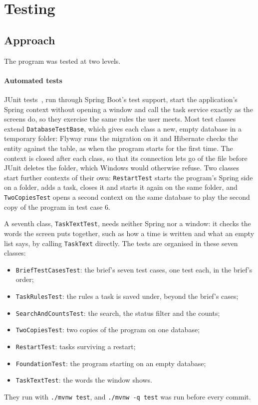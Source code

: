 \section{Testing}\label{sec:testing}

\subsection{Approach}

The program was tested at two levels.

\paragraph*{Automated tests} JUnit tests~\cite{junit}, run through Spring Boot's test support, start the
application's Spring context without opening a window and call the task service exactly as the screens do, so they
exercise the same rules the user meets. Most test classes extend \texttt{DatabaseTestBase}, which gives each class a
new, empty database in a temporary folder: Flyway runs the migration on it and Hibernate checks the entity against
the table, as when the program starts for the first time. The context is closed after each class, so that its
connection lets go of the file before JUnit deletes the folder, which Windows would otherwise refuse. Two classes
start further contexts of their own: \texttt{RestartTest} starts the program's Spring side on a folder, adds a task,
closes it and starts it again on the same folder, and \texttt{TwoCopiesTest} opens a second context on the same
database to play the second copy of the program in test case 6.

A seventh class, \texttt{TaskTextTest}, needs neither Spring nor a window: it checks the words the screen puts
together, such as how a time is written and what an empty list says, by calling \texttt{TaskText} directly. The tests
are organised in these seven classes:
\begin{itemize}
  \item \texttt{BriefTestCasesTest}: the brief's seven test cases, one test each, in the brief's order;
  \item \texttt{TaskRulesTest}: the rules a task is saved under, beyond the brief's cases;
  \item \texttt{SearchAndCountsTest}: the search, the status filter and the counts;
  \item \texttt{TwoCopiesTest}: two copies of the program on one database;
  \item \texttt{RestartTest}: tasks surviving a restart;
  \item \texttt{FoundationTest}: the program starting on an empty database;
  \item \texttt{TaskTextTest}: the words the window shows.
\end{itemize}
They run with \texttt{./mvnw test}, and \texttt{./mvnw -q test} was run before every commit.

